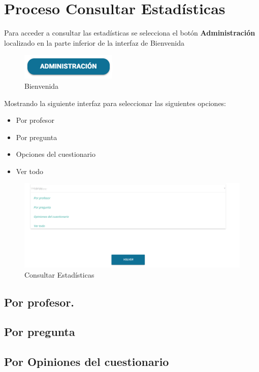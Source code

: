 \chapter{Proceso Consultar Estadísticas }
	Para acceder a consultar las estadísticas se selecciona el botón 
	\textbf{Administración} localizado en la parte inferior de la interfaz de 
	Bienvenida 
	\begin{figure}[hbtp]

	\includegraphics[scale=0.3]{images/Interfaz/IUGS01_botonadmin.PNG}
	\caption{Bienvenida}
	\end{figure}
		
	Mostrando la siguiente interfaz para seleccionar las siguientes 
	opciones:
	\begin{itemize}
		\item Por profesor
		\item Por pregunta
		\item Opciones del cuestionario
		\item Ver todo 
	\end{itemize}
	
	\begin{figure}[hbtp]

	\includegraphics[scale=0.3]{images/Interfaz/IUGS15_estadisticas.PNG}
	\caption{Consultar Estadísticas}
	\end{figure}
	

\section{Por profesor.}
	

\section{Por pregunta}
	


\section{Por Opiniones del cuestionario}
	
